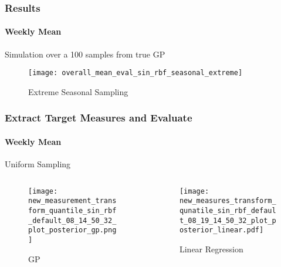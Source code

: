 \documentclass[
	8pt, %
]{beamer}
\begin{document}
\begin{frame}
	\frametitle{Results}
	\framesubtitle{Weekly Mean} %

	Simulation over a 100 samples from true GP

	\begin{figure}
			\texttt{[image: overall\_mean\_eval\_sin\_rbf\_seasonal\_extreme]}
			\caption{Extreme Seasonal Sampling}
	\end{figure}
\end{frame}



\begin{frame}
	\frametitle{Extract Target Measures and Evaluate}
	\framesubtitle{Weekly Mean} %

	Uniform Sampling
	\begin{columns}[c] %
		\begin{column}{0.45\textwidth} %
				\begin{figure}
					\texttt{[image: new\_measurement\_transform\_quantile\_sin\_rbf\_default\_08\_14\_50\_32\_plot\_posterior\_gp.png]}
					\caption{GP}

				\end{figure}
		\end{column}
		\begin{column}{0.5\textwidth} %
				\begin{figure}
					\texttt{[image: new\_measures\_transform\_qunatile\_sin\_rbf\_default\_08\_19\_14\_50\_32\_plot\_posterior\_linear.pdf]}
					\caption{Linear Regression}
				\end{figure}

		\end{column}
	\end{columns}



\end{frame}
\end{document}
